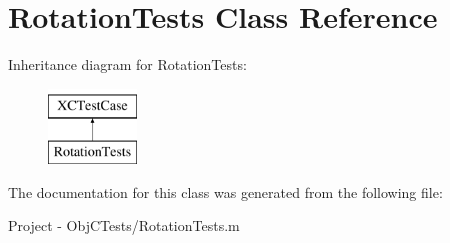 \hypertarget{interface_rotation_tests}{}\section{Rotation\+Tests Class Reference}
\label{interface_rotation_tests}
Inheritance diagram for Rotation\+Tests\+:\begin{figure}[H]
\begin{center}
\leavevmode
\includegraphics[height=2.000000cm]{interface_rotation_tests}
\end{center}
\end{figure}


The documentation for this class was generated from the following file\+:\begin{DoxyCompactItemize}
\item 
Project -\/ Obj\+C\+Tests/Rotation\+Tests.\+m\end{DoxyCompactItemize}
